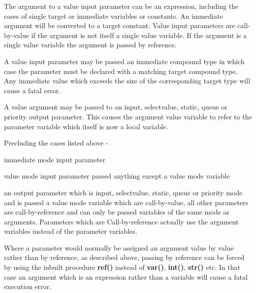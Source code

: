             The argument to a value input parameter can be an expression,
            including the cases of single target or immediate variables or
            constants. An immediate argument will be converted to a target
            constant. Value input parameters are call-by-value if the argument
            is not itself a single value variable. If the argument is a single
            value variable the argument is passed by reference.
            
            A value input parameter may be passed an immediate compound
            type in which case the parameter must be declared with a matching
            target compound type. Any immediate value which exceeds the
            size of the corresponding target type will cause a fatal error.
            
            A value argument may be passed to an input, selectvalue, static,
            queue or priority output parameter. This causes the argument value
            variable to refer to the parameter variable which itself is now a
            local variable.

            Precluding the cases listed above -
            \blist
            \item   immediate mode input parameter
            \item   value mode input parameter passed anything except a value
                    mode variable
            \item   an output parameter which is input, selectvalue, static,
                    queue or priority mode and is passed a value mode variable
            \blend
            which are call-by-value, all other parameters are
            call-by-reference and can only be passed variables of the same
            mode as arguments. Parameters which are Call-by-reference actually
            use the argument variables instead of the parameter variables.
            
            Where a parameter would normally be assigned an argument value by
            value rather than by reference, as described above, passing by
            reference can be forced by using the inbuilt procedure {\bf ref()}
             instead of {\bf var()}, {\bf int()}, {\bf
            str()} etc. In that case an argument which is an expression rather
            than a variable will cause a fatal execution error.
            
